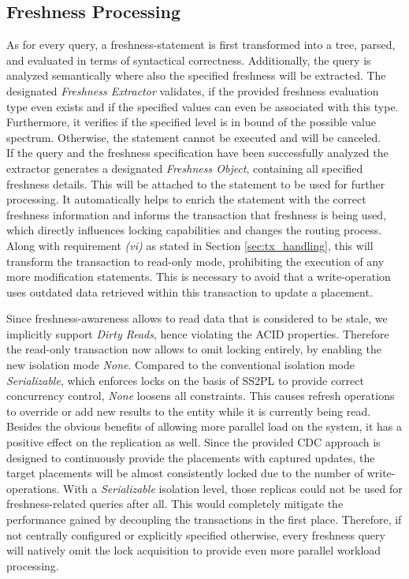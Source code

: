 
\subsection{Freshness Processing}
\label{sec:fresh_proc}

As for every query, a freshness-statement is first transformed into a tree, parsed, and evaluated in terms of syntactical correctness. 
Additionally, the query is analyzed semantically where also the specified freshness will be extracted. The designated \textit{Freshness Extractor} 
validates, if the provided freshness evaluation type even exists and if the specified values can even be associated with this type.
Furthermore, it verifies if the specified level is in bound of the possible value spectrum. 
Otherwise, the statement cannot be executed and will be canceled.\\
If the query and the freshness specification have been successfully analyzed the extractor generates a designated \textit{Freshness Object}, 
containing all specified freshness details. This will be attached to the statement to be used for further processing.
It automatically helps to enrich the statement with the correct freshness information and informs the transaction that freshness is being used,
which directly influences locking capabilities and changes the routing process. 
Along with requirement \textit{(vi)} as stated in Section \ref{sec:tx_handling}, this will transform the transaction to read-only mode, prohibiting the execution of any more modification
statements. This is necessary to avoid that a write-operation uses outdated data retrieved within this transaction to update a placement.

Since freshness-awareness allows to read data that is considered to be stale, we implicitly support \emph{Dirty Reads}, hence violating the ACID properties.
Therefore the read-only transaction now allows to omit locking entirely, by enabling the new isolation mode \emph{None}. 
Compared to the conventional isolation mode \emph{Serializable}, which enforces locks on the basis of SS2PL to provide correct concurrency control, \emph{None} 
loosens all constraints. This causes refresh operations to override or add new results to the entity while it is currently being read. 
Besides the obvious benefits of allowing more parallel load on the system, it has a positive effect on the replication as well.
Since the provided CDC approach is designed to continuously provide the placements with captured updates, the target placements will be almost consistently locked due 
to the number of write-operations.
With a \emph{Serializable} isolation level, those replicas could not be used for freshness-related queries after all. 
This would completely mitigate the performance gained by decoupling the transactions in the first place. 
Therefore, if not centrally configured or explicitly specified otherwise, every freshness query will natively omit the lock acquisition to provide even more parallel workload processing.





